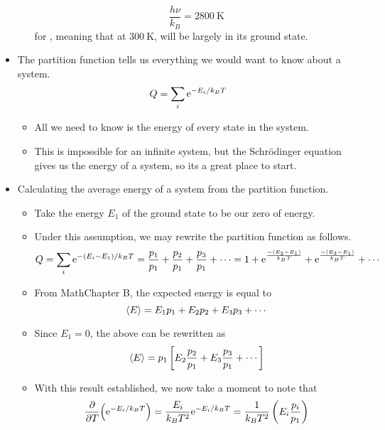 \documentclass[../notes.tex]{subfiles}
\begin{document}
\begin{itemize}
\begin{itemize}
\begin{equation*}
            \frac{h\nu}{k_B} = \SI{2800}{\kelvin}
        \end{equation*}
        for , meaning that at $\SI{300}{\kelvin}$,  will be largely in its ground state.
    \end{itemize}
    \item The partition function tells us everything we would want to know about a system.
    \begin{equation*}
        Q = \sum_i\e[-E_i/k_BT]
    \end{equation*}
    \begin{itemize}
        \item All we need to know is the energy of every state in the system.
        \item This is impossible for an infinite system, but the Schr\"{o}dinger equation gives us the energy of a system, so its a great place to start.
    \end{itemize}
    \item Calculating the average energy of a system from the partition function.
    \begin{itemize}
        \item Take the energy $E_1$ of the ground state to be our zero of energy.
        \item Under this assumption, we may rewrite the partition function as follows.
        \begin{equation*}
            Q = \sum_i\e[-(E_i-E_1)/k_BT]
            = \frac{p_1}{p_1}+\frac{p_2}{p_1}+\frac{p_3}{p_1}+\cdots
            = 1+\e[\frac{-(E_2-E_1)}{k_BT}]+\e[\frac{-(E_3-E_1)}{k_BT}]+\cdots
        \end{equation*}
        \item From MathChapter B, the expected energy is equal to
        \begin{equation*}
            \prb{E} = E_1p_1+E_2p_2+E_3p_3+\cdots
        \end{equation*}
        \item Since $E_1=0$, the above can be rewritten as
        \begin{equation*}
            \prb{E} = p_1\left[ E_2\frac{p_2}{p_1}+E_3\frac{p_3}{p_1}+\cdots \right]
        \end{equation*}
        \item With this result established, we now take a moment to note that
        \begin{equation*}
            \pdv{T}(\e[-E_i/k_BT]) = \frac{E_i}{k_BT^2}\e[-E_i/k_BT]
            = \frac{1}{k_BT^2}\left( E_i\frac{p_i}{p_1} \right)

\end{equation*}
\end{itemize}
\end{itemize}
\end{document}
